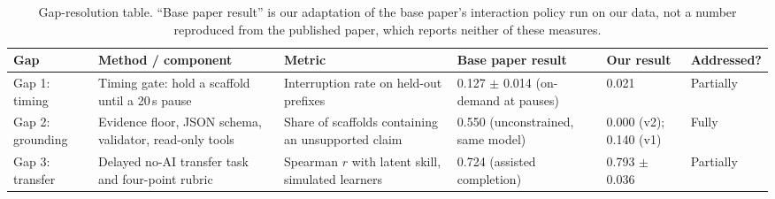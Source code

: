 \begin{table}[t]
\centering
\caption{Gap-resolution table. ``Base paper result'' is our adaptation of the base
paper's interaction policy run on our data, not a number reproduced from the published
paper, which reports neither of these measures.}
\label{tab:gaps}
\begin{tabular}{p{1.6cm}p{3.5cm}p{3.1cm}p{2.9cm}p{2.2cm}l}
\toprule
Gap & Method / component & Metric & Base paper result & Our result & Addressed? \\
\midrule
Gap 1: timing & Timing gate: hold a scaffold until a 20\,s pause & Interruption rate on held-out prefixes & 0.127 $\pm$ 0.014 (on-demand at pauses) & 0.021 & Partially \\
Gap 2: grounding & Evidence floor, JSON schema, validator, read-only tools & Share of scaffolds containing an unsupported claim & 0.550 (unconstrained, same model) & 0.000 (v2); 0.140 (v1) & Fully \\
Gap 3: transfer & Delayed no-AI transfer task and four-point rubric & Spearman $r$ with latent skill, simulated learners & 0.724 (assisted completion) & 0.793 $\pm$ 0.036 & Partially \\
\bottomrule
\end{tabular}
\end{table}
